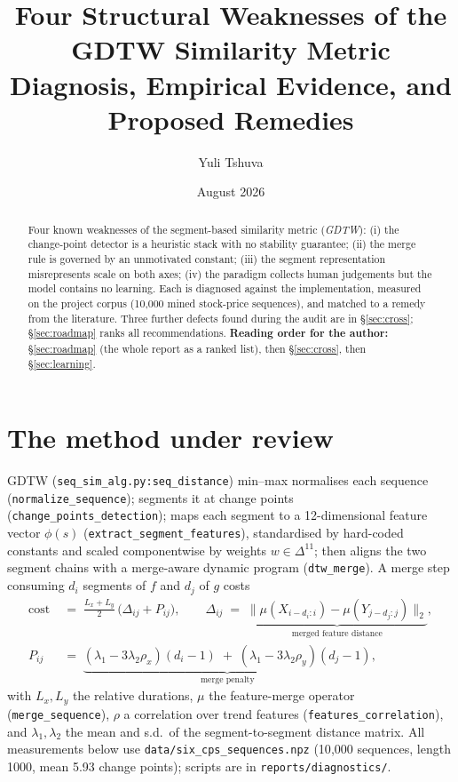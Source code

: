 \documentclass[11pt]{article}
\title{\textbf{Four Structural Weaknesses of the GDTW Similarity Metric}\\
\large Diagnosis, Empirical Evidence, and Proposed Remedies}
\author{Yuli Tshuva}
\date{August 2026}
\newcommand{\code}[1]{\texttt{\small #1}}
\begin{document}
\maketitle
\vspace{-1.5em}

\begin{abstract}
\noindent
Four known weaknesses of the segment-based similarity metric (\emph{GDTW}): (i) the
change-point detector is a heuristic stack with no stability guarantee; (ii) the merge rule
is governed by an unmotivated constant; (iii) the segment representation misrepresents scale
on both axes; (iv) the paradigm collects human judgements but the model contains no learning.
Each is diagnosed against the implementation, measured on the project corpus (10{,}000 mined
stock-price sequences), and matched to a remedy from the literature. Three further defects
found during the audit are in \S\ref{sec:cross}; \S\ref{sec:roadmap} ranks all
recommendations. \textbf{Reading order for the author:} \S\ref{sec:roadmap} (the whole report
as a ranked list), then \S\ref{sec:cross}, then \S\ref{sec:learning}.
\end{abstract}

\vspace{-0.5em}
{\small\tableofcontents}

\section{The method under review}
GDTW (\code{seq\_sim\_alg.py:seq\_distance}) min--max normalises each sequence
(\code{normalize\_sequence}); segments it at change points
(\code{change\_points\_detection}); maps each segment to a 12-dimensional feature vector
$\phi(s)$ (\code{extract\_segment\_features}), standardised by hard-coded constants and
scaled componentwise by weights $w \in \Delta^{11}$; then aligns the two segment chains with
a merge-aware dynamic program (\code{dtw\_merge}). A merge step consuming $d_i$ segments of
$f$ and $d_j$ of $g$ costs
\begin{equation}
\label{eq:cost}
\begin{split}
  \mathrm{cost} \;&=\; \frac{L_x + L_y}{2}\,\big( \Delta_{ij} + P_{ij} \big), \qquad
  \Delta_{ij} \;=\; \underbrace{\big\lVert \mu(X_{i-d_i:i}) - \mu(Y_{j-d_j:j}) \big\rVert_2}_{\text{merged feature distance}}, \\[2pt]
  P_{ij} \;&=\; \underbrace{(\lambda_1 - 3\lambda_2 \rho_x)(d_i-1) \;+\; (\lambda_1 - 3\lambda_2 \rho_y)(d_j-1)}_{\text{merge penalty}},
\end{split}
\end{equation}
with $L_x,L_y$ the relative durations, $\mu$ the feature-merge operator
(\code{merge\_sequence}), $\rho$ a correlation over trend features
(\code{features\_correlation}), and $\lambda_1,\lambda_2$ the mean and s.d.\ of the
segment-to-segment distance matrix. All measurements below use
\code{data/six\_cps\_sequences.npz} (10{,}000 sequences, length 1000, mean 5.93 change
points); scripts are in \code{reports/diagnostics/}.
\end{document}
